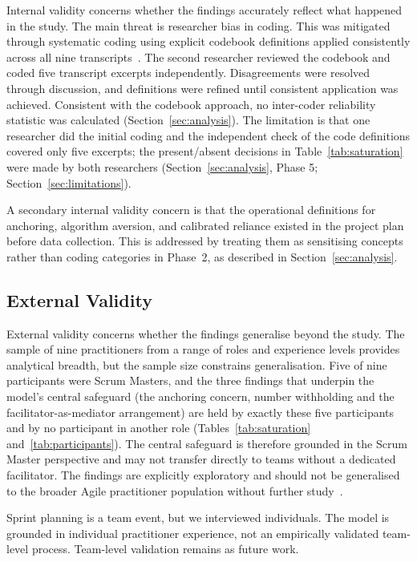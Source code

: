 \documentclass[a4paper,twoside]{bth}
\begin{document}
Internal validity concerns whether the findings accurately reflect what happened in the study. The main threat is researcher bias in coding. This was mitigated through systematic coding using explicit codebook definitions applied consistently across all nine transcripts~\cite{creswell2013}. The second researcher reviewed the codebook and coded five transcript excerpts independently. Disagreements were resolved through discussion, and definitions were refined until consistent application was achieved. Consistent with the codebook approach, no inter-coder reliability statistic was calculated (Section~\ref{sec:analysis}). The limitation is that one researcher did the initial coding and the independent check of the code definitions covered only five excerpts; the present/absent decisions in Table~\ref{tab:saturation} were made by both researchers (Section~\ref{sec:analysis}, Phase 5; Section~\ref{sec:limitations}).

A secondary internal validity concern is that the operational definitions for anchoring, algorithm aversion, and calibrated reliance existed in the project plan before data collection. This is addressed by treating them as sensitising concepts rather than coding categories in Phase~2, as described in Section~\ref{sec:analysis}.

\subsection{External Validity}

External validity concerns whether the findings generalise beyond the study. The sample of nine practitioners from a range of roles and experience levels provides analytical breadth, but the sample size constrains generalisation. Five of nine participants were Scrum Masters, and the three findings that underpin the model's central safeguard (the anchoring concern, number withholding and the facilitator-as-mediator arrangement) are held by exactly these five participants and by no participant in another role (Tables~\ref{tab:saturation} and~\ref{tab:participants}). The central safeguard is therefore grounded in the Scrum Master perspective and may not transfer directly to teams without a dedicated facilitator. The findings are explicitly exploratory and should not be generalised to the broader Agile practitioner population without further study~\cite{creswell2013}.

Sprint planning is a team event, but we interviewed individuals. The model is grounded in individual practitioner experience, not an empirically validated team-level process. Team-level validation remains as future work.
\end{document}

